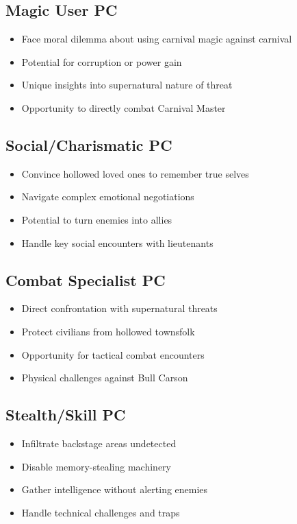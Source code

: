 \documentclass[11pt]{article}
\begin{document}
\subsection{Magic User PC}
\begin{itemize}
\item Face moral dilemma about using carnival magic against carnival
\item Potential for corruption or power gain
\item Unique insights into supernatural nature of threat
\item Opportunity to directly combat Carnival Master
\end{itemize}

\subsection{Social/Charismatic PC}
\begin{itemize}
\item Convince hollowed loved ones to remember true selves
\item Navigate complex emotional negotiations
\item Potential to turn enemies into allies
\item Handle key social encounters with lieutenants
\end{itemize}

\subsection{Combat Specialist PC}
\begin{itemize}
\item Direct confrontation with supernatural threats
\item Protect civilians from hollowed townsfolk
\item Opportunity for tactical combat encounters
\item Physical challenges against Bull Carson
\end{itemize}

\subsection{Stealth/Skill PC}
\begin{itemize}
\item Infiltrate backstage areas undetected
\item Disable memory-stealing machinery
\item Gather intelligence without alerting enemies
\item Handle technical challenges and traps
\end{itemize}
\end{document}
